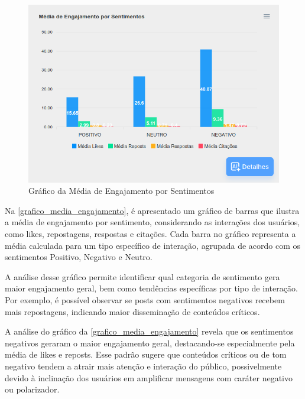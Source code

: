 \documentclass[
	12pt,				%
	oneside,			%
	a4paper,			%
	english,			%
	french,				%
	spanish,			%
	brazil				%
	]{abntex2}
\begin{document}
\begin{figure}[htbp]
\hypertarget{grafico_media_engajamento}{%
\caption{Gráfico da Média de Engajamento por Sentimentos}\label{grafico_media_engajamento}
\begin{center}
\includegraphics[scale=0.3]{imagens/sentilytics/estudo-caso/media_engajamento_por_sentimento.png}
\end{center}
}
\end{figure}

Na \autoref{grafico_media_engajamento}, é apresentado um gráfico de
barras que ilustra a média de engajamento por sentimento, considerando
as interações dos usuários, como likes, repostagens, respostas e
citações. Cada barra no gráfico representa a média calculada para um
tipo específico de interação, agrupada de acordo com os sentimentos
Positivo, Negativo e Neutro.

A análise desse gráfico permite identificar qual categoria de sentimento
gera maior engajamento geral, bem como tendências específicas por tipo
de interação. Por exemplo, é possível observar se posts com sentimentos
negativos recebem mais repostagens, indicando maior disseminação de
conteúdos críticos.

A análise do gráfico da \autoref{grafico_media_engajamento} revela que
os sentimentos negativos geraram o maior engajamento geral,
destacando-se especialmente pela média de likes e reposts. Esse padrão
sugere que conteúdos críticos ou de tom negativo tendem a atrair mais
atenção e interação do público, possivelmente devido à inclinação dos
usuários em amplificar mensagens com caráter negativo ou polarizador.
\end{document}
